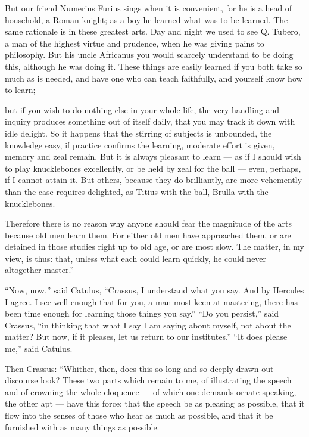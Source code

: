  But our friend Numerius Furius sings when it is convenient, for he is a head of household, a Roman knight; as a boy he learned what was to be learned. The same rationale is in these greatest arts. Day and night we used to see Q. Tubero, a man of the highest virtue and prudence, when he was giving pains to philosophy. But his uncle Africanus you would scarcely understand to be doing this, although he was doing it. These things are easily learned if you both take so much as is needed, and have one who can teach faithfully, and yourself know how to learn;

 but if you wish to do nothing else in your whole life, the very handling and inquiry produces something out of itself daily, that you may track it down with idle delight. So it happens that the stirring of subjects is unbounded, the knowledge easy, if practice confirms the learning, moderate effort is given, memory and zeal remain. But it is always pleasant to learn — as if I should wish to play knucklebones excellently, or be held by zeal for the ball — even, perhaps, if I cannot attain it. But others, because they do brilliantly, are more vehemently than the case requires delighted, as Titius with the ball, Brulla with the knucklebones.

 Therefore there is no reason why anyone should fear the magnitude of the arts because old men learn them. For either old men have approached them, or are detained in those studies right up to old age, or are most slow. The matter, in my view, is thus: that, unless what each could learn quickly, he could never altogether master.''

 ``Now, now,'' said Catulus, ``Crassus, I understand what you say. And by Hercules I agree. I see well enough that for you, a man most keen at mastering, there has been time enough for learning those things you say.'' ``Do you persist,'' said Crassus, ``in thinking that what I say I am saying about myself, not about the matter? But now, if it pleases, let us return to our institutes.'' ``It does please me,'' said Catulus.

 Then Crassus: ``Whither, then, does this so long and so deeply drawn-out discourse look? These two parts which remain to me, of illustrating the speech and of crowning the whole eloquence — of which one demands ornate speaking, the other apt — have this force: that the speech be as pleasing as possible, that it flow into the senses of those who hear as much as possible, and that it be furnished with as many things as possible.


